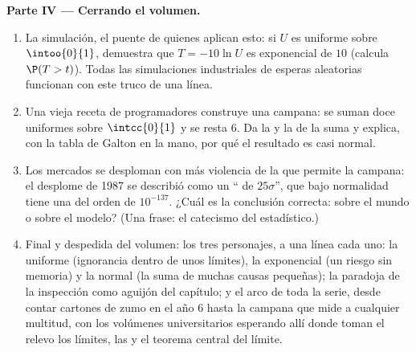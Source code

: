 \begin{problem}
\medskip
\noindent\textbf{Parte IV --- Cerrando el volumen.}
\begin{enumerate}[resume]
  \item La simulación, el puente de quienes aplican esto: si $U$ es
        uniforme sobre $\intoo{0}{1}$, demuestra que $T = -10\ln U$ es
        exponencial de  $10$ (calcula $\P(T > t)$). Todas las
        simulaciones industriales de esperas aleatorias funcionan con este
        truco de una línea.
  \item Una vieja receta de programadores construye una campana: se suman
        doce uniformes  sobre $\intcc{0}{1}$ y se resta $6$.
        Da la  y la  de la suma y explica, con la tabla de
        Galton en la mano, por qué el resultado es casi normal.
  \item Los mercados se desploman con más violencia de la que permite la
        campana: el desplome de 1987 se describió como un `` de
        $25\sigma$'', que bajo normalidad tiene una  del orden
        de $10^{-137}$. ¿Cuál es la conclusión correcta: sobre el mundo o
        sobre el modelo? (Una frase: el catecismo del estadístico.)
  \item Final y despedida del volumen: los tres personajes, a una línea
        cada uno: la uniforme (ignorancia dentro de unos límites), la
        exponencial (un riesgo sin memoria) y la normal (la suma de muchas
        causas pequeñas); la paradoja de la inspección como aguijón del
        capítulo; y el arco de toda la serie, desde contar cartones de
        zumo en el año 6 hasta la campana que mide a cualquier multitud,
        con los volúmenes universitarios esperando allí donde toman el
        relevo los límites, las  y el teorema central del
        límite.
\end{enumerate}
\end{problem}
